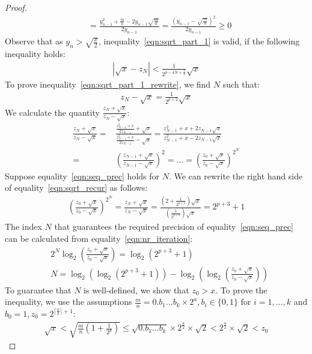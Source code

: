 \documentclass{article}
\numberwithin{mytheorem}{section}
\begin{document}
\begin{proof}
\begin{align*}
&=\frac{y_{n-1}^2+\frac{m}{n}-2y_{n-1}\sqrt{\frac{m}{n}}}{2y_{n-1}}=\frac{(y_{n-1}-\sqrt{\frac{m}{n}})^2}{2y_{n-1}}\geq 0
\end{align*} 
Observe that as $y_n>\sqrt{\frac{x}{2}}$, inequality~\eqref{eqn:sqrt_part_1} is valid, if the following inequality holds:
\begin{align}
|\sqrt{x}-z_N|<\frac{1}{2^{p-4N+\frac{3}{2}}}\sqrt{x}\label{eqn:sqrt_part_1_rewrite}
\end{align}
To prove inequality~\eqref{eqn:sqrt_part_1_rewrite}, we find $N$ such that:
\begin{align}
z_N-\sqrt{x}=\frac{1}{2^{p+2}}\sqrt{x}\label{eqn:seq_prec}
\end{align} 
We calculate the quantity  $\frac{z_N+\sqrt{x}}{z_N-\sqrt{x}}$:
\begin{align}
\frac{z_N+\sqrt{x}}{z_N-\sqrt{x}}=&\frac{\frac{z_{N-1}^2+x}{2z_{N-1}}+\sqrt{x}}{\frac{z_{N-1}^2+x}{2z_{N-1}}-\sqrt{x}}=\frac{z_{N-1}^2+x+2z_{N-1}\sqrt{x}}{z_{N-1}^2+x-2z_{N-1}\sqrt{x}}\nonumber\\
=&(\frac{z_{N-1}+\sqrt{x}}{z_{N-1}-\sqrt{x}})^2=\ldots=(\frac{z_{0}+\sqrt{x}}{z_{0}-\sqrt{x}})^{2^{N}}\label{eqn:sqrt_recur}
\end{align}
Suppose equality~\eqref{eqn:seq_prec} holds for $N$. We can rewrite the right hand side of equality~\eqref{eqn:sqrt_recur} as follows:
\begin{align}
(\frac{z_{0}+\sqrt{x}}{z_{0}-\sqrt{x}})^{2^{N}}=\frac{z_N+\sqrt{x}}{z_N-\sqrt{x}}=\frac{(2+\frac{1}{2^{p+2}})\sqrt{x}}{(\frac{1}{2^{p+2}})\sqrt{x}}=2^{p+3}+1\label{eqn:nr_iteration}
\end{align}
The index $N$ that guarantees the required precision of equality~\eqref{eqn:seq_prec} can be calculated from equality~\eqref{eqn:nr_iteration}:
\begin{align}
&2^{N}\log_2 (\frac{z_{0}+\sqrt{x}}{z_{0}-\sqrt{x}})=\log_2 (2^{p+3}+1)\nonumber\\
&N=\log_2 (\log_2 (2^{p+3}+1))- \log_2 (\log_2 (\frac{z_{0}+\sqrt{x}}{z_{0}-\sqrt{x}}))\label{eqn:nr_iteration_rewrite}
\end{align}
To guarantee that $N$ is well-defined, we show that $z_0>x$. To prove the inequality, we use the assumptions $\frac{m}{n}=0.b_1\ldots b_k\times 2^a, b_i\in \{0,1\} \text{ for }i=1,\ldots , k$ and $b_0=1, z_0=2^{\lceil \frac{a}{2}\rceil +1}$:
\begin{align*}
\sqrt{x}<\sqrt{\frac{m}{n}(1+\frac{1}{2^p})}\leq\sqrt{0.b_1\ldots b_k}\times 2^{\frac{a}{2}}\times \sqrt{2}<2^{\frac{a}{2}}\times \sqrt{2}<z_0

\end{align*}
\end{proof}
\end{document}
